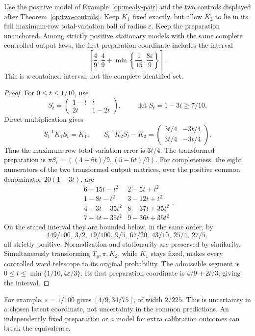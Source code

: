 \begin{theorem}
\label{op:calibration-interval}
Use the positive model of Example~\ref{op:mealy-pair} and the two
controls displayed after Theorem~\ref{op:two-controls}.
Keep \(K_1\) fixed exactly, but allow \(K_2\) to lie in its full
maximum-row total-variation ball of radius \(\varepsilon\).
Keep the preparation unanchored.  Among strictly positive stationary
models with the same complete controlled output laws, the first
preparation coordinate includes the interval
\[
 \left[\frac49,\frac49+\min\left\{\frac1{15},
                                      \frac{8\varepsilon}{9}\right\}\right].
\]
This is a contained interval, not the complete identified set.
\end{theorem}
\begin{proof}
For \(0\le t\le1/10\), use
\[
 S_t=\begin{pmatrix}1-t&t\\2t&1-2t\end{pmatrix},
 \qquad \det S_t=1-3t\ge7/10.
\]
Direct multiplication gives
\[
 S_t^{-1}K_1S_t=K_1,\qquad
 S_t^{-1}K_2S_t-K_2
 =\begin{pmatrix}3t/4&-3t/4\\3t/4&-3t/4\end{pmatrix}.
\]
Thus the maximum-row total variation error is \(3t/4\).
The transformed preparation is
\(\pi S_t=((4+6t)/9,(5-6t)/9)\).
For completeness, the eight numerators of the two transformed output
matrices, over the positive common denominator \(20(1-3t)\), are
\[
 \begin{array}{cc}
 6-15t-t^2&2-5t+t^2\\
 1-8t-t^2&3-12t+t^2\\[2pt]
 4-3t-35t^2&8-37t+35t^2\\
 7-4t-35t^2&9-36t+35t^2
 \end{array}.
\]
On the stated interval they are bounded below, in the same order, by
\[
 449/100,\ 3/2,\ 19/100,\ 9/5,\
 67/20,\ 43/10,\ 25/4,\ 27/5,
\]
all strictly positive.  Normalization and stationarity are preserved by
similarity.  Simultaneously transforming \(T_y,\pi,K_2\), while \(K_1\)
stays fixed, makes every controlled word telescope to its original
probability.  The admissible segment is
\(0\le t\le\min\{1/10,4\varepsilon/3\}\).
Its first preparation coordinate is \(4/9+2t/3\), giving the interval.
\end{proof}

For example, \(\varepsilon=1/100\) gives
\([4/9,34/75]\), of width \(2/225\).
This is uncertainty in a chosen latent coordinate, not uncertainty in
the common predictions.  An independently fixed preparation or a
model for extra calibration outcomes can break the equivalence.

